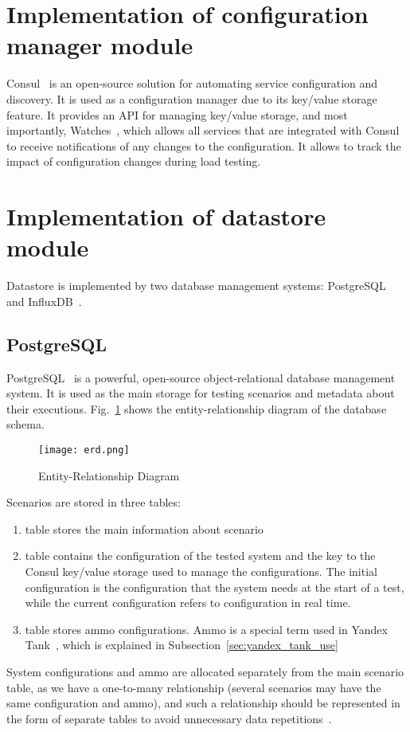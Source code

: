 \section{Implementation of configuration manager module}
Consul~\cite{consul} is an open-source solution for automating service configuration and discovery. It is used as a configuration manager due to its key/value storage feature. It provides an API for managing key/value storage, and most importantly, Watches~\cite{consul_watches}, which allows all services that are integrated with Consul to receive notifications of any changes to the configuration. It allows to track the impact of configuration changes during load testing.


\section{Implementation of datastore module}\label{sec:implementation-of-datastore}
Datastore is implemented by two database management systems: PostgreSQL~\cite{postgresql} and InfluxDB~\cite{influxdb}.

\subsection{PostgreSQL}\label{subsec:postgresql}
PostgreSQL~\cite{postgresql} is a powerful, open-source object-relational database management system. It is used as the main storage for testing scenarios and metadata about their executions. Fig.~\ref{fig:erd} shows the entity-relationship diagram of the database schema.
\begin{figure}[t]
    \centering
    \texttt{[image: erd.png]}
    \caption{Entity-Relationship Diagram}
    \label{fig:erd}
\end{figure}

Scenarios are stored in three tables:
\begin{enumerate}
    \item {} table stores the main information about scenario
    \item {} table contains the configuration of the tested system and the key to the Consul key/value storage used to manage the configurations. The initial configuration is the configuration that the system needs at the start of a test, while the current configuration refers to configuration in real time.
    \item {} table stores ammo configurations. Ammo is a special term used in Yandex Tank~\cite{yandex_tank}, which is explained in Subsection~\ref{sec:yandex_tank_use}
\end{enumerate}
System configurations and ammo are allocated separately from the main scenario table, as we have a one-to-many relationship (several scenarios may have the same configuration and ammo), and such a relationship should be represented in the form of separate tables to avoid unnecessary data repetitions~\cite{normal_forms}.

